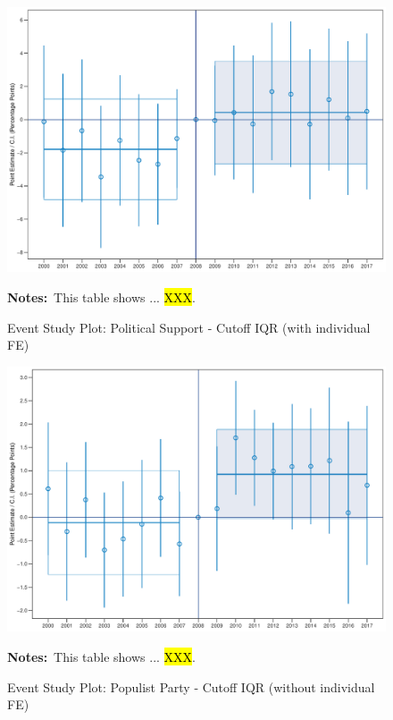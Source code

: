 \documentclass[11pt]{article}
\begin{document}
\begin{figure}[htbp!]
    \centering
    \caption{Event Study Plot: Political Support - Cutoff IQR (with individual FE)}\label{fig:dynamic_did_cbk_past_mean_ps_iqr_ife}
    \includegraphics[width=1\linewidth]{events/dynamic_did_cbk_past_mean_ps_iqr_ife}
    \begin{tablenotes}
        \footnotesize
        \item \textbf{Notes:}~This table shows ... \hl{XXX}.
    \end{tablenotes} 
\end{figure}

\begin{figure}[htbp!]
    \centering
    \caption{Event Study Plot: Populist Party - Cutoff IQR (without individual FE)}\label{fig:dynamic_did_cbk_past_mean_pp_iqr_noife}
    \includegraphics[width=1\linewidth]{events/dynamic_did_cbk_past_mean_pp_iqr_noife}
    \begin{tablenotes}
        \footnotesize
        \item \textbf{Notes:}~This table shows ... \hl{XXX}.
    \end{tablenotes} 
\end{figure}
\end{document}
